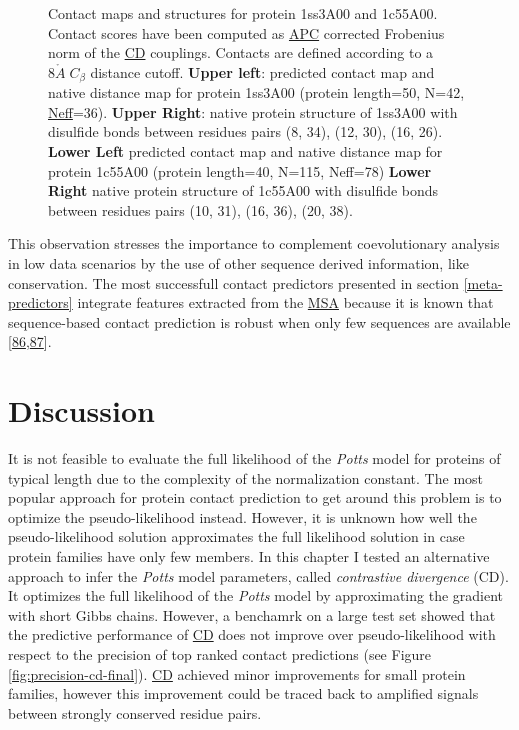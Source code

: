 \documentclass[11pt,a4paper,twoside]{book}
\newcommand{\Cb}{C_\beta}
\newcommand{\angstrom}{\mathring{A} \;}
\theoremstyle{definition}
\theoremstyle{definition}
\theoremstyle{remark}
\begin{document}
\begin{figure}
{}

\caption{Contact maps and
structures for protein 1ss3A00 and 1c55A00. Contact scores have been
computed as \protect\hyperlink{abbrev}{APC} corrected Frobenius norm of
the \protect\hyperlink{abbrev}{CD} couplings. Contacts are defined
according to a \(8 \angstrom \Cb\) distance cutoff. \textbf{Upper left}:
predicted contact map and native distance map for protein 1ss3A00
(protein length=50, N=42, \protect\hyperlink{abbrev}{Neff}=36).
\textbf{Upper Right}: native protein structure of 1ss3A00 with disulfide
bonds between residues pairs (8, 34), (12, 30), (16, 26). \textbf{Lower
Left} predicted contact map and native distance map for protein 1c55A00
(protein length=40, N=115, Neff=78) \textbf{Lower Right} native protein
structure of 1c55A00 with disulfide bonds between residues pairs (10,
31), (16, 36), (20, 38).}\label{fig:cd-predictions-small-neff-proteins}
\end{figure}

This observation stresses the importance to complement coevolutionary
analysis in low data scenarios by the use of other sequence derived
information, like conservation. The most successfull contact predictors
presented in section \ref{meta-predictors} integrate features extracted
from the \protect\hyperlink{abbrev}{MSA} because it is known that
sequence-based contact prediction is robust when only few sequences are
available
{[}\protect\hyperlink{ref-Stahl2017}{86},\protect\hyperlink{ref-He2017}{87}{]}.

\section{Discussion}\label{discussion-1}

It is not feasible to evaluate the full likelihood of the \emph{Potts}
model for proteins of typical length due to the complexity of the
normalization constant. The most popular approach for protein contact
prediction to get around this problem is to optimize the
pseudo-likelihood instead. However, it is unknown how well the
pseudo-likelihood solution approximates the full likelihood solution in
case protein families have only few members. In this chapter I tested an
alternative approach to infer the \emph{Potts} model parameters, called
\emph{contrastive divergence} (CD). It optimizes the full likelihood of
the \emph{Potts} model by approximating the gradient with short Gibbs
chains. However, a benchamrk on a large test set showed that the
predictive performance of \protect\hyperlink{abbrev}{CD} does not
improve over pseudo-likelihood with respect to the precision of top
ranked contact predictions (see Figure \ref{fig:precision-cd-final}).
\protect\hyperlink{abbrev}{CD} achieved minor improvements for small
protein families, however this improvement could be traced back to
amplified signals between strongly conserved residue pairs.
\end{document}
